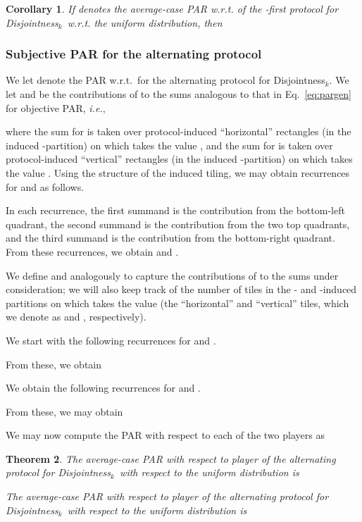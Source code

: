 \documentclass{article}
\theoremstyle{theorem}
\newtheorem{theorem}{Theorem}[section]
\newtheorem{cor}[theorem]{Corollary}
\theoremstyle{definition}
\theoremstyle{remark}
\newcommand{\ie}{\emph{i.e.}}
\newcommand{\disjoint}{{\sc Dis\-joint\-ness}\ensuremath{_k}}
\begin{document}
\begin{cor}
If  denotes the average-case PAR w.r.t.  of the -first protocol for \disjoint\ w.r.t. the uniform distribution, then

\end{cor}

\subsubsection{Subjective PAR for the alternating protocol}

We let  denote the PAR w.r.t.\  for the alternating protocol for \disjoint.  We let  and  be the contributions of  to the sums analogous to that in Eq.~\ref{eq:pargen} for objective PAR, \ie,

where the sum for  is taken over protocol-induced ``horizontal'' rectangles  (in the induced -partition) on which  takes the value , and the sum for  is taken over protocol-induced ``vertical'' rectangles  (in the induced -partition) on which  takes the value .  Using the structure of the induced tiling,
we may obtain recurrences for  and  as follows.

In each recurrence, the first summand is the contribution from the bottom-left quadrant, the second summand is the contribution from the two top quadrants, and the third summand is the contribution from the bottom-right quadrant.  From these recurrences, we obtain  and .


We define  and  analogously to capture the contributions of  to the sums under consideration; we will also keep track of the number of tiles in the - and -induced partitions on which  takes the value  (the ``horizontal'' and ``vertical'' tiles, which we denote as  and , respectively).

We start with the following recurrences for  and .

From these, we obtain


We obtain the following recurrences for  and .

From these, we may obtain



We may now compute the PAR with respect to each of the two players as



\begin{theorem}
The average-case PAR with respect to player  of the alternating protocol for \disjoint\ with respect to the uniform distribution is

The average-case PAR with respect to player  of the alternating protocol for \disjoint\ with respect to the uniform distribution is

\end{theorem}
\end{document}
